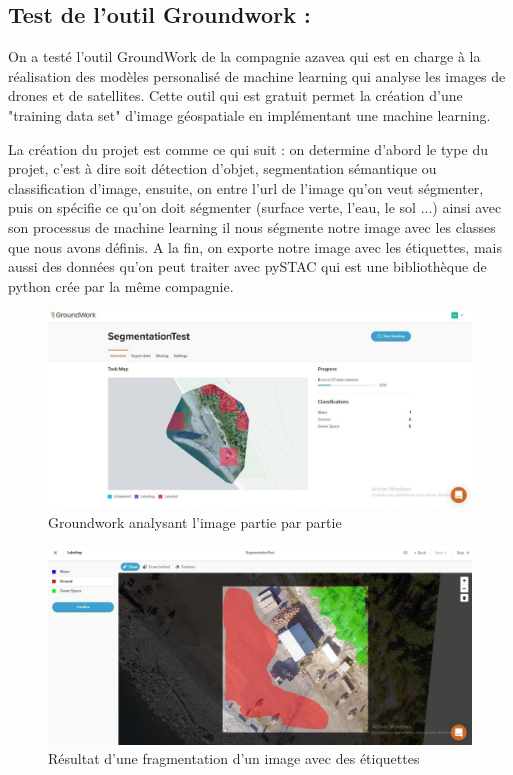 \documentclass[12pt, openany]{report}
\begin{document}
\subsection{Test de l'outil Groundwork :}

On a testé l'outil GroundWork de la compagnie azavea qui est en charge à la réalisation des modèles personalisé de machine learning qui analyse les images de drones et de satellites.
Cette outil qui est gratuit permet la création d'une "training data set" d'image géospatiale en implémentant une machine learning.
\par
La création du projet est comme ce qui suit : on determine d'abord le type du projet, c'est à dire soit détection d'objet, segmentation sémantique ou classification d'image, ensuite, on entre l'url de l'image qu'on veut ségmenter, puis on spécifie ce qu'on doit ségmenter (surface verte, l'eau, le sol ...) ainsi avec son processus de machine learning il nous ségmente notre image avec les classes que nous avons définis.
A la fin, on exporte notre image avec les étiquettes, mais aussi des données qu'on peut traiter avec pySTAC qui est une bibliothèque de python crée par la même compagnie.

\begin{figure}[H]
\centering
\includegraphics[scale=0.4]{groundwork_screen1.jpg}
\caption{Groundwork analysant l'image partie par partie}
\end{figure}

\begin{figure}[H]
\centering
\includegraphics[scale=0.4]{groundwork_screen2.jpg}
\caption{Résultat d'une fragmentation d'un image avec des étiquettes}
\end{figure}
\end{document}

